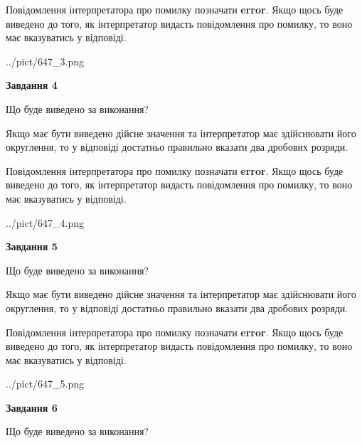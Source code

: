 \documentclass[12pt, ukrainian]{article}
\begin{document}
{\begin {Large}
Повідомлення інтерпретатора про помилку позначати \textbf{error}.
Якщо щось буде виведено до того, як інтерпретатор видасть повідомлення про помилку, 
то воно має вказуватись у відповіді. \par

\begin{center}
	{../pict/647_3.png}
\end{center}
\newpage

{\begin {center}\textbf{Завдання 4}\end {center}}\par
Що буде виведено за виконання? \par

Якщо має бути виведено дійсне значення та інтерпретатор має здійснювати його округлення, 
то у відповіді достатньо правильно вказати два дробових розряди.

Повідомлення інтерпретатора про помилку позначати \textbf{error}.
Якщо щось буде виведено до того, як інтерпретатор видасть повідомлення про помилку, 
то воно має вказуватись у відповіді. \par

\begin{center}
	{../pict/647_4.png}
\end{center}
\newpage

{\begin {center}\textbf{Завдання 5}\end {center}}\par
Що буде виведено за виконання? \par

Якщо має бути виведено дійсне значення та інтерпретатор має здійснювати його округлення, 
то у відповіді достатньо правильно вказати два дробових розряди.

Повідомлення інтерпретатора про помилку позначати \textbf{error}.
Якщо щось буде виведено до того, як інтерпретатор видасть повідомлення про помилку, 
то воно має вказуватись у відповіді. \par

\begin{center}
	{../pict/647_5.png}
\end{center}
\newpage

{\begin {center}\textbf{Завдання 6}\end {center}}\par
Що буде виведено за виконання? \par


\end{Large}}
\end{document}
